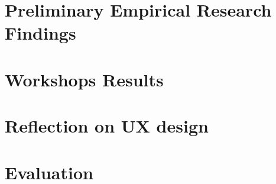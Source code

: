 
\section{Preliminary Empirical Research Findings}
\section{Workshops Results}
\section{Reflection on UX design}
\section{Evaluation}